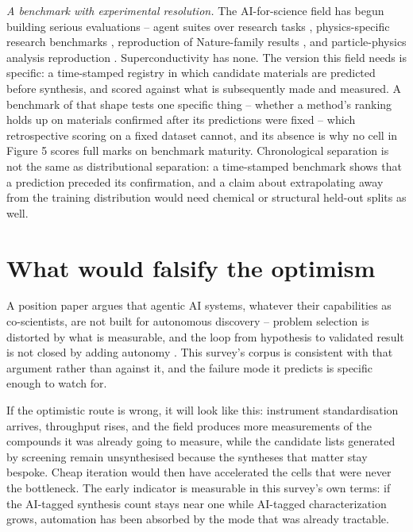 \documentclass[
  11pt,
]{article}
\newcounter{none} %
\begin{document}
\emph{A benchmark with experimental resolution.} The AI-for-science
field has begun building serious evaluations -- agent suites over
research tasks \citep{bragg2025astabench}, physics-specific research
benchmarks \citep{miao2026prlbench}, reproduction of Nature-family
results \citep{wang2026naturebench}, and particle-physics analysis
reproduction \citep{faroughy2026colliderbench}. Superconductivity has
none. The version this field needs is specific: a time-stamped registry
in which candidate materials are predicted before synthesis, and scored
against what is subsequently made and measured. A benchmark of that
shape tests one specific thing -- whether a method's ranking holds up on
materials confirmed after its predictions were fixed -- which
retrospective scoring on a fixed dataset cannot, and its absence is why
no cell in Figure 5 scores full marks on benchmark maturity.
Chronological separation is not the same as distributional separation: a
time-stamped benchmark shows that a prediction preceded its
confirmation, and a claim about extrapolating away from the training
distribution would need chemical or structural held-out splits as well.

\section{What would falsify the
optimism}\label{what-would-falsify-the-optimism}

A position paper argues that agentic AI systems, whatever their
capabilities as co-scientists, are not built for autonomous discovery --
problem selection is distorted by what is measurable, and the loop from
hypothesis to validated result is not closed by adding autonomy
\citep{bisht2026agentic}. This survey's corpus is consistent with that
argument rather than against it, and the failure mode it predicts is
specific enough to watch for.

If the optimistic route is wrong, it will look like this: instrument
standardisation arrives, throughput rises, and the field produces more
measurements of the compounds it was already going to measure, while the
candidate lists generated by screening remain unsynthesised because the
syntheses that matter stay bespoke. Cheap iteration would then have
accelerated the cells that were never the bottleneck. The early
indicator is measurable in this survey's own terms: if the AI-tagged
synthesis count stays near one while AI-tagged characterization grows,
automation has been absorbed by the mode that was already tractable.
\end{document}
